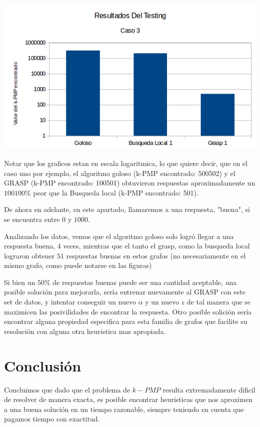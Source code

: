 \includegraphics[scale=0.5]{Con/dificil3.png}

Notar que los graficos estan en escala logaritmica, lo que quiere decir, que en el caso uno por ejemplo, el algoritmo goloso (k-PMP encontrado: 500502) y el GRASP (k-PMP encontrado: 100501) obtuvieron respuestas aproximadamente un $100100 \%$ peor que la Busqueda local (k-PMP encontrado: 501).

De ahora en adelante, en este apartado, llamaremos a una respuesta, "buena", si se encuentra entre 0 y $1000$.

Analizando los datos, vemos que el algoritmo goloso solo logró llegar a una respuesta buena, 4 veces, mientras que el tanto el grasp, como la busqueda local lograron obtener $51$ respuestas buenas en estos grafos (no necesariamente en el mismo grafo, como puede notarse en las figuras)

Si bien un $50 \%$ de respuestas buenas puede ser una cantidad aceptable, una posible solución para mejorarla, sería entrenar nuevamente al GRASP con este set de datos, y intentar conseguir un nuevo $\alpha$ y un nuevo $z$ de tal manera que se maximicen las posivilidades de encontrar la respuesta. Otro posible solición sería encontrar alguna propiedad especifica para esta familia de grafos que facilite su resolución con alguna otra heuristica mas apropiada.

\section{Conclusión}

Concluimos que dado que el problema de $k-PMP$ resulta extremadamente dificil de resolver de manera exacta, es posible encontrar heuristicas que nos aproximen a una buena solución en un tiempo razonable, siempre teniendo en cuenta que pagamos tiempo con exactitud.

